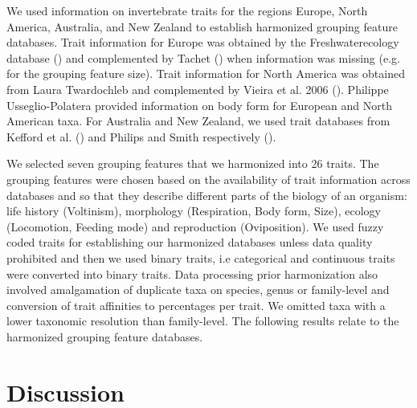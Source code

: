 \documentclass{article}
\begin{document}
We used information on invertebrate traits for the regions Europe, North America, Australia, and New Zealand to establish harmonized grouping feature databases. Trait information for Europe was obtained by the Freshwaterecology database (\cite{schmidt-kloiber_www.freshwaterecology.info_2015}) and complemented by Tachet (\cite{usseglio-polatera_biomonitoring_2000}) when information was missing (e.g. for the grouping feature size). Trait information for North America was obtained from Laura Twardochleb and complemented by Vieira et al. 2006 (\cite{vieira_database_nodate}). Philippe Usseglio-Polatera provided information on body form for European and North American taxa. For Australia and New Zealand, we used trait databases from Kefford et al. (\cite{kefford_integrated_2020}) and Philips and Smith respectively (\cite{Philips_and_Smith_NZ_DB_2018}).

We selected seven grouping features that we harmonized into 26 traits. The grouping features were chosen based on the availability of trait information across databases and so that they describe different parts of the biology of an organism: life history (Voltinism), morphology (Respiration, Body form, Size), ecology (Locomotion, Feeding mode) and reproduction (Oviposition).
We used fuzzy coded traits for establishing our harmonized databases unless data quality prohibited and then we used binary traits, i.e categorical and continuous traits were converted into binary traits. Data processing prior harmonization also involved amalgamation of duplicate taxa on species, genus or family-level and conversion of trait affinities to percentages per trait. We omitted taxa with a lower taxonomic resolution than family-level. The following results relate to the harmonized grouping feature databases.



\newpage 


\newpage 



\newpage 



\section*{Discussion}


\printbibliography
\newpage




\end{document}
